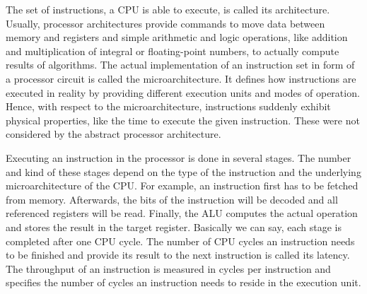 \documentclass{stdlocal}
\begin{document}
    The set of instructions, a CPU is able to execute, is called its architecture.
    Usually, processor architectures provide commands to move data between memory and registers and simple arithmetic and logic operations, like addition and multiplication of integral or floating-point numbers, to actually compute results of algorithms.
    The actual implementation of an instruction set in form of a processor circuit is called the microarchitecture.
    It defines how instructions are executed in reality by providing different execution units and modes of operation.
    Hence, with respect to the microarchitecture, instructions suddenly exhibit physical properties, like the time to execute the given instruction.
    These were not considered by the abstract processor architecture.
    \autocite{hennessy2019,patterson2014}

    Executing an instruction in the processor is done in several stages.
    The number and kind of these stages depend on the type of the instruction and the underlying microarchitecture of the CPU.
    For example, an instruction first has to be fetched from memory.
    Afterwards, the bits of the instruction will be decoded and all referenced registers will be read.
    Finally, the ALU computes the actual operation and stores the result in the target register.
    Basically we can say, each stage is completed after one CPU cycle.
    The number of CPU cycles an instruction needs to be finished and provide its result to the next instruction is called its latency.
    The throughput of an instruction is measured in cycles per instruction and specifies the number of cycles an instruction needs to reside in the execution unit.
    \autocite{intel-latency-throughput}
\end{document}
